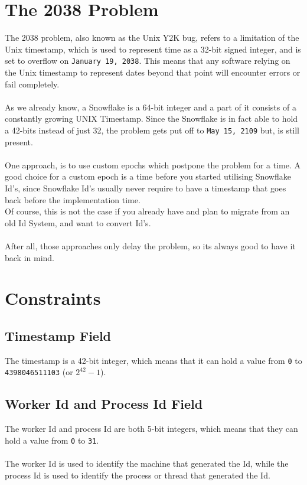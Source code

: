 \documentclass{article}
\newcommand{\code}[1]{\colorbox{cverbbg}{\texttt{#1}}}
\newcommand{\hn}[0]{\hfill \\}
\begin{document}
\section{The 2038 Problem}
\label{year_3038_problem}
The 2038 problem, also known as the Unix Y2K bug, refers to a limitation of the
Unix timestamp, which is used to represent time as a 32-bit signed integer, and
is set to overflow on \code{January 19, 2038}. This means that any software
relying on the Unix timestamp to represent dates beyond that point will
encounter errors or fail completely. \\
\hn{}
As we already know, a Snowflake is a 64-bit integer and a part of it consists
of a constantly growing UNIX Timestamp. Since the Snowflake is in fact able to
hold a 42-bits instead of just 32, the problem gets put off to \code{May 15,
	2109} but, is still present. \\
\hn{}
One approach, is to use custom epochs which postpone the problem for a time. A
good choice for a custom epoch is a time before you started utilising Snowflake
Id's, since Snowflake Id's usually never require to have a timestamp that goes
back before the implementation time. \\
Of course, this is not the case if you already have and plan to migrate from an
old Id System, and want to convert Id's. \\
\hn{}
After all, those approaches only delay the problem, so its always good to have
it back in mind.

\section{Constraints}

\subsection{Timestamp Field}
The timestamp is a 42-bit integer, which means that it can hold a value from
\code{0} to \code{4398046511103} (or $2^{42} - 1$).

\subsection{Worker Id and Process Id Field}
The worker Id and process Id are both 5-bit integers, which means that they
can hold a value from \code{0} to \code{31}. \\
\hn{}
The worker Id is used to identify the machine that generated the Id, while the
process Id is used to identify the process or thread that generated the Id.\@
\end{document}
